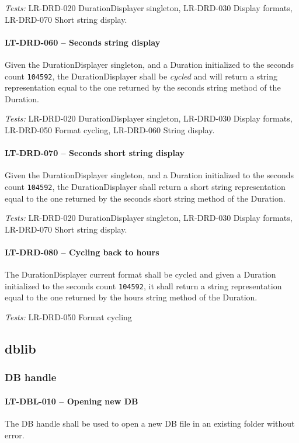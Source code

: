 \textit{Tests: } LR-DRD-020 DurationDisplayer singleton,
LR-DRD-030 Display formats, LR-DRD-070 Short string
display.

\paragraph{LT-DRD-060 -- Seconds string display}
Given the DurationDisplayer singleton, and a Duration initialized
to the seconds count \lstinline{104592}, the DurationDisplayer
shall be \emph{cycled} and will return a string representation equal to
the one returned by the seconds string method of the Duration.

\textit{Tests: } LR-DRD-020 DurationDisplayer singleton,
LR-DRD-030 Display formats, LR-DRD-050 Format cycling, LR-DRD-060 String
display.

\paragraph{LT-DRD-070 -- Seconds short string display}
Given the DurationDisplayer singleton, and a Duration initialized
to the seconds count \lstinline{104592}, the DurationDisplayer
shall return a short string representation equal to
the one returned by the seconds short string method of the Duration.

\textit{Tests: } LR-DRD-020 DurationDisplayer singleton,
LR-DRD-030 Display formats, LR-DRD-070 Short string
display.

\paragraph{LT-DRD-080 -- Cycling back to hours}
The DurationDisplayer current format shall be cycled and
given a Duration initialized to the seconds count \lstinline{104592},
it shall return a string representation equal to the one returned
by the hours string method of the Duration.

\textit{Tests: } LR-DRD-050 Format cycling

\subsection{db\textunderscore lib}
\subsubsection{DB handle}
\paragraph{LT-DBL-010 -- Opening new DB}
The DB handle shall be used to open a new DB file in an existing
folder without error.


